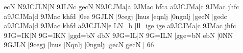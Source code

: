 \temps\notes\rlap{\sk\sk\DEP}ecN\enotes
\barre\notes\LPED\qsoupir
\cinqx N{\qqbbH9JCJLN}|\uptext{\ppff\fff}\sfwu N\enotes
\temps\notes\qqbbl9JLNc\enotes
\motif gecN\relax
\barre\notes\LPED\qsoupir
\cinqx N{\qqbbH9JCJMa}|\sfwu a\enotes
\temps\notes\qqbbl9JMac\enotes
\motif hfca\relax
\barre\notes\LPED\qsoupir
\cinqx a{\qqbbH9JCJMa}|\sfwu c\enotes
\temps\notes\qqbbl9JMac\enotes
\motif jhfc\relax
 \def\atnextline{\autolines{8}76}\relax
\barre\notes\LPED\qsoupir
\cinqx a{\qqbbH9JCJMa}|\sfwu d\enotes
\temps\notes\qqbbl9JMac\enotes
\motif khfd\relax
\barre\notes\LPED{}|\itenl0e\sfwu e\enotes
\temps\notes\qqbbl9GJLN\enotes
\zbarre\notes|\qqbbl9cegj\enotes
\temps\notes|lnus\enotes
\barre\notes|\zhl eqnlj\enotes
\temps\notes|\qqbbH0ngnlj\enotes
\zbarre\notes|\raise \Interligne\rlap{\hpause}gecN\enotes
\temps\notes\sk\sk\DEP|gedc\enotes
\barre\notes\LPED\qsoupir
\cinqx a{\qqbbH9JCJMa}|\sfwu d\enotes
\temps\notes\qqbbl9JMac\enotes
\motif khfd\relax
\barre\notes\LPED\qsoupir
\cinqx a{\qqbbH9JCJLN}|\sfwu e\enotes
\temps\notes{}LN{=b}\enotes
\zbarre\notes|\lsf ll{=i}ge\enotes
\temps\notes\rlap{\sk\sk\sk\DEP}ige\enotes
\def\atnextline{\autolines966}%
\barre\notes\LPED\qsoupir
\cinqx a{\qqbbH9JCJMa}|\sfwu c\enotes
\temps\notes\qqbbl9JMac\enotes
\motif jhfc\relax
\barre\notes\LPED\qsoupir
{\tqbbH9JG{=I}K}|\sfwu N\enotes
\temps\notes\qqbbl9G{=I}KN\enotes
\zbarre\notes|\lsf ggd{=b}N\enotes
\temps\notes\rlap{\sk\sk\sk\DEP}dbN\enotes
\barre\notes\LPED\qsoupir
{\tqbbH9JG{=I}L}|\sfwu N\enotes
\temps\notes\qqbbl9G{=I}LN\enotes
\zbarre\notes|\lsf gge{=b}N\enotes
\temps\notes{}ebN\enotes
\barre\notes\LPED{}|\itenl0N\sfwu N\enotes
\temps\notes\qqbbl9GJLN\enotes
\zbarre\notes|\qqbbl9cegj\enotes
\temps\notes|lnus\enotes
\troistemps\changecontext\notes|\zw Nqnlj\enotes
\temps\notes|\qqbbH0ngnlj\enotes
\temps\notes|gecN\enotes
\zbarre\notes{}\relax{}gecN\enotes
\temps\Notes\BassC\sk|\qsk\hpause\enotes
%
\def\motif#1#2#3#4{\zbarre\notes|\usf{!'#1}\qqbbl{-9}{#1}{#2}{#3}{#4}\enotes
\temps\notes\sk\sk\sk\DEP|\qqbbu{-9}{!#1}{#2}{#3}{#4}\enotes}%
%
\alapage{}66\relax
